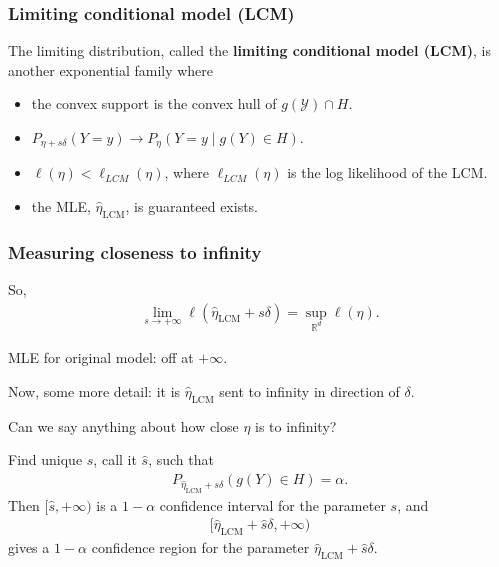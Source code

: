 \documentclass[slidestop,compress, 10pt]{beamer}
\def\RR{{\mathbb R}}
\def\YY{{\mathcal Y}}
\newcommand{\etaLCM}{\hat{\eta}_{\textrm{LCM}}}
\begin{document}
\frame
{
  \frametitle{Limiting conditional model (LCM)}  
	The limiting distribution, called the \textbf{limiting conditional model (LCM)}, is another exponential family where
	\begin{itemize}
		\item the convex support is the convex hull of $g(\YY) \cap H$.
		\item $P_{\eta + s \delta}( Y = y) \to P_{\eta}( Y =y \mid g(Y) \in H)$.
		\item $\ell(\eta) < \ell_{LCM}(\eta)$, where $\ell_{LCM}(\eta)$ is the log likelihood of the LCM.
		\item the MLE, $\etaLCM$, is guaranteed exists.
	\end{itemize}
}
\frame
{
  \frametitle{Measuring closeness to infinity}  
So,
\begin{align*}
	\lim_{s \to +\infty} \ell(\etaLCM + s\delta) = \sup_{\RR^d} \ell(\eta).
\end{align*}	

MLE for original model: off at $+\infty$.

Now, some more detail: it is $\etaLCM$ sent to infinity in direction of $\delta$.
\vspace{2mm}

Can we say anything about how close $\eta$ is to infinity?  

Find unique $s$, call it $\hat{s}$, such that
\begin{align*}
		P_{\etaLCM + s \delta}( g(Y) \in H) = \alpha.
\end{align*}
Then $[ \hat{s}, +\infty)$ is a $1- \alpha$ confidence interval for the parameter $s$, and
\begin{align*}
[ \etaLCM + \hat{s} \delta, + \infty)
\end{align*}
gives a $1 - \alpha$ confidence region for the parameter $\etaLCM + \hat{s} \delta$.
}
\end{document}
